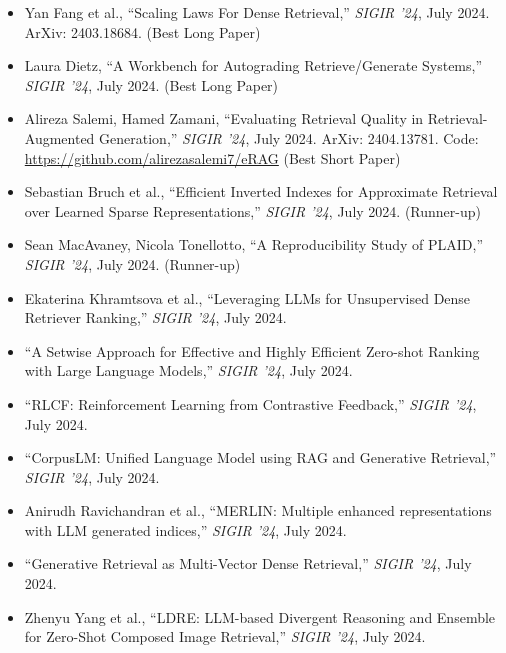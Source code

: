 \documentclass[11pt,letterpaper]{article}
\begin{document}
\begin{itemize}[leftmargin=*]
    \item Yan Fang et al., ``Scaling Laws For Dense Retrieval,'' \textit{SIGIR '24}, July 2024. ArXiv: 2403.18684. (Best Long Paper)

    \item Laura Dietz, ``A Workbench for Autograding Retrieve/Generate Systems,'' \textit{SIGIR '24}, July 2024. (Best Long Paper)

    \item Alireza Salemi, Hamed Zamani, ``Evaluating Retrieval Quality in Retrieval-Augmented Generation,'' \textit{SIGIR '24}, July 2024. ArXiv: 2404.13781. Code: \url{https://github.com/alirezasalemi7/eRAG} (Best Short Paper)

    \item Sebastian Bruch et al., ``Efficient Inverted Indexes for Approximate Retrieval over Learned Sparse Representations,'' \textit{SIGIR '24}, July 2024. (Runner-up)

    \item Sean MacAvaney, Nicola Tonellotto, ``A Reproducibility Study of PLAID,'' \textit{SIGIR '24}, July 2024. (Runner-up)

    \item Ekaterina Khramtsova et al., ``Leveraging LLMs for Unsupervised Dense Retriever Ranking,'' \textit{SIGIR '24}, July 2024.

    \item ``A Setwise Approach for Effective and Highly Efficient Zero-shot Ranking with Large Language Models,'' \textit{SIGIR '24}, July 2024.

    \item ``RLCF: Reinforcement Learning from Contrastive Feedback,'' \textit{SIGIR '24}, July 2024.

    \item ``CorpusLM: Unified Language Model using RAG and Generative Retrieval,'' \textit{SIGIR '24}, July 2024.

    \item Anirudh Ravichandran et al., ``MERLIN: Multiple enhanced representations with LLM generated indices,'' \textit{SIGIR '24}, July 2024.

    \item ``Generative Retrieval as Multi-Vector Dense Retrieval,'' \textit{SIGIR '24}, July 2024.

    \item Zhenyu Yang et al., ``LDRE: LLM-based Divergent Reasoning and Ensemble for Zero-Shot Composed Image Retrieval,'' \textit{SIGIR '24}, July 2024.


\end{itemize}
\end{document}
